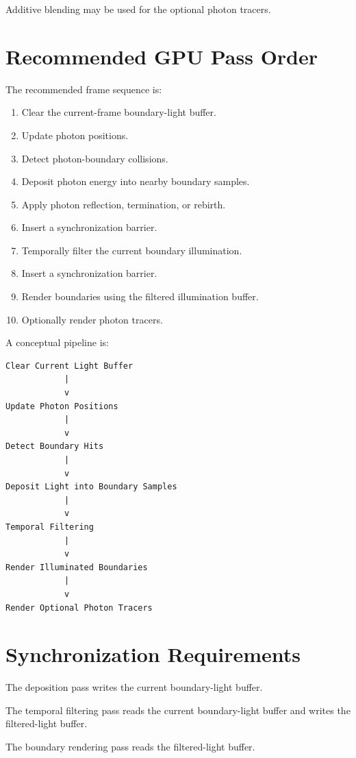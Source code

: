 \documentclass[11pt]{article}
\begin{document}
Additive blending may be used for the optional photon tracers.

\section{Recommended GPU Pass Order}

The recommended frame sequence is:

\begin{enumerate}
    \item Clear the current-frame boundary-light buffer.
    \item Update photon positions.
    \item Detect photon-boundary collisions.
    \item Deposit photon energy into nearby boundary samples.
    \item Apply photon reflection, termination, or rebirth.
    \item Insert a synchronization barrier.
    \item Temporally filter the current boundary illumination.
    \item Insert a synchronization barrier.
    \item Render boundaries using the filtered illumination buffer.
    \item Optionally render photon tracers.
\end{enumerate}

A conceptual pipeline is:

\begin{lstlisting}
Clear Current Light Buffer
            |
            v
Update Photon Positions
            |
            v
Detect Boundary Hits
            |
            v
Deposit Light into Boundary Samples
            |
            v
Temporal Filtering
            |
            v
Render Illuminated Boundaries
            |
            v
Render Optional Photon Tracers
\end{lstlisting}

\section{Synchronization Requirements}

The deposition pass writes the current boundary-light buffer.

The temporal filtering pass reads the current boundary-light buffer and writes
the filtered-light buffer.

The boundary rendering pass reads the filtered-light buffer.
\end{document}

